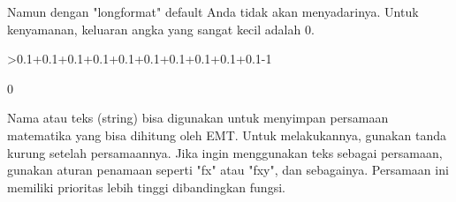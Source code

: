 \documentclass[a4paper,10pt]{article}
\begin{document}
\begin{eulernotebook}
\begin{eulercomment}
\begin{eulercomment}
\begin{eulercomment}
\begin{eulercomment}
\begin{eulercomment}
Namun dengan "longformat" default Anda tidak akan menyadarinya. Untuk
kenyamanan, keluaran angka yang sangat kecil adalah 0.
\end{eulercomment}
\begin{eulerprompt}
>0.1+0.1+0.1+0.1+0.1+0.1+0.1+0.1+0.1+0.1-1
\end{eulerprompt}
\begin{euleroutput}
  0
\end{euleroutput}
\begin{eulercomment}
\begin{eulercomment}
\begin{eulercomment}
Nama atau teks (string) bisa digunakan untuk menyimpan persamaan
matematika yang bisa dihitung oleh EMT. Untuk melakukannya, gunakan
tanda kurung setelah persamaannya. Jika ingin menggunakan teks sebagai
persamaan, gunakan aturan penamaan seperti "fx" atau "fxy", dan
sebagainya. Persamaan ini memiliki prioritas lebih tinggi dibandingkan
fungsi.


\end{eulercomment}
\end{eulercomment}
\end{eulercomment}
\end{eulercomment}
\end{eulercomment}
\end{eulercomment}
\end{eulercomment}
\end{eulernotebook}
\end{document}
